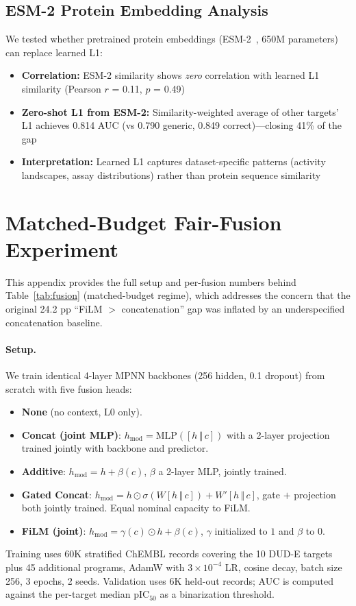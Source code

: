\documentclass[sigconf]{acmart}
\begin{document}
\subsection{ESM-2 Protein Embedding Analysis}

We tested whether pretrained protein embeddings (ESM-2~\cite{lin_2023_esm2}, 650M parameters) can replace learned L1:

\begin{itemize}[noitemsep,topsep=0pt]
\item \textbf{Correlation:} ESM-2 similarity shows \textit{zero} correlation with learned L1 similarity (Pearson $r$ = 0.11, $p$ = 0.49)
\item \textbf{Zero-shot L1 from ESM-2:} Similarity-weighted average of other targets' L1 achieves 0.814 AUC (vs 0.790 generic, 0.849 correct)---closing 41\% of the gap
\item \textbf{Interpretation:} Learned L1 captures dataset-specific patterns (activity landscapes, assay distributions) rather than protein sequence similarity
\end{itemize}

\section{Matched-Budget Fair-Fusion Experiment}
\label{app:fair_fusion}

This appendix provides the full setup and per-fusion numbers behind Table~\ref{tab:fusion} (matched-budget regime), which addresses the concern that the original 24.2 pp ``FiLM $>$ concatenation'' gap was inflated by an underspecified concatenation baseline.

\paragraph{Setup.} We train identical 4-layer MPNN backbones (256 hidden, 0.1 dropout) from scratch with five fusion heads:
\begin{itemize}[noitemsep,topsep=0pt]
\item \textbf{None} (no context, L0 only).
\item \textbf{Concat (joint MLP)}: $h_{\text{mod}} = \text{MLP}([h \,\Vert\, c])$ with a 2-layer projection trained jointly with backbone and predictor.
\item \textbf{Additive}: $h_{\text{mod}} = h + \beta(c)$, $\beta$ a 2-layer MLP, jointly trained.
\item \textbf{Gated Concat}: $h_{\text{mod}} = h \odot \sigma(W[h\,\Vert\,c]) + W'[h\,\Vert\,c]$, gate $+$ projection both jointly trained. Equal nominal capacity to FiLM.
\item \textbf{FiLM (joint)}: $h_{\text{mod}} = \gamma(c) \odot h + \beta(c)$, $\gamma$ initialized to $1$ and $\beta$ to $0$.
\end{itemize}
Training uses 60K stratified ChEMBL records covering the 10 DUD-E targets plus 45 additional programs, AdamW with $3\times 10^{-4}$ LR, cosine decay, batch size 256, 3 epochs, 2 seeds. Validation uses 6K held-out records; AUC is computed against the per-target median pIC$_{50}$ as a binarization threshold.
\end{document}
